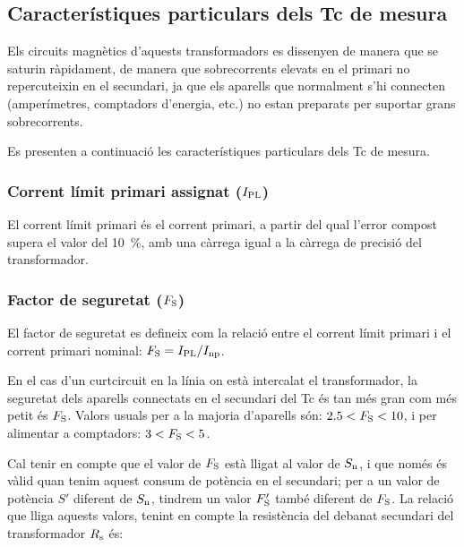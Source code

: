 \subsection{Característiques particulars dels Tc de mesura}

Els circuits magnètics d'aquests transformadors es dissenyen de
manera que se saturin ràpidament, de manera que
sobrecorrents elevats en el primari  no repercuteixin en el secundari,
ja que els aparells que normalment s'hi connecten (amperímetres,
comptadors d'energia, etc.) no estan preparats per suportar grans
sobrecorrents.

Es presenten a continuació les característiques particulars dels Tc
de mesura.

\subsubsection{Corrent límit primari  assignat ($I_\mathrm{PL}$)}

El corrent  límit primari
és el corrent primari, a partir del qual l'error compost supera el valor del \SI{10}{\percent}, amb una càrrega igual a la càrrega de
precisió del transformador.

\subsubsection{Factor de seguretat ($F_\mathrm{S}$) }

 El factor de seguretat
es defineix com la relació entre el corrent límit primari
i el corrent primari nominal: $F_\mathrm{S} = I_\mathrm{PL} / I_\mathrm{np}$.

En el cas d'un curtcircuit en la línia on està intercalat el
transformador, la seguretat dels aparells connectats en el secundari
del Tc és tan més gran com més petit és  $F_\mathrm{S}$. Valors usuals
per a la majoria d'aparells són:  $\num{2,5}<F_\mathrm{S}<10$, i per
alimentar a comptadors: $3<F_\mathrm{S}<5$.

Cal tenir en compte que el valor de $F_\mathrm{S}$ està lligat
 al valor de $S_\mathrm{n}$, i que només és vàlid
quan tenim aquest consum de  potència en el secundari; per a un
valor de potència $S'$ diferent de $S_\mathrm{n}$, tindrem un valor
$F'_\mathrm{S}$ també diferent de  $F_\mathrm{S}$. La relació que
lliga aquests valors, tenint en compte la resistència del debanat
secundari del transformador  $R_\mathrm{s}$ és:

